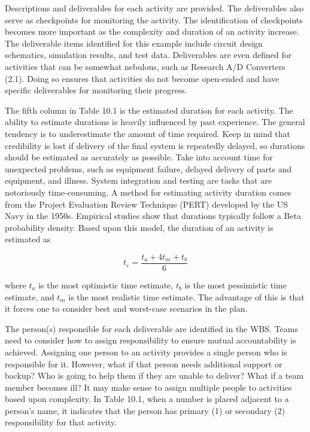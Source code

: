 Descriptions and deliverables for each activity are provided. The
deliverables also serve as checkpoints for monitoring the activity. The
identification of checkpoints becomes more important as the complexity
and duration of an activity increase. The deliverable items identified
for this example include circuit design schematics, simulation results,
and test data. Deliverables are even defined for activities that can be
somewhat nebulous, such as Research A/D Converters (2.1). Doing so
ensures that activities do not become open-ended and have specific
deliverables for monitoring their progress.

The fifth column in Table 10.1 is the estimated duration for each
activity. The ability to estimate durations is heavily influenced by
past experience. The general tendency is to underestimate the amount of
time required. Keep in mind that credibility is lost if delivery of the
final system is repeatedly delayed, so durations should be estimated as
accurately as possible. Take into account time for unexpected problems,
such as equipment failure, delayed delivery of parts and equipment, and
illness. System integration and testing are tasks that are notoriously
time-consuming. A method for estimating activity duration comes from the
Project Evaluation Review Technique (PERT) developed by the US Navy in
the 1950s. Empirical studies show that durations typically follow a Beta
probability density. Based upon this model, the duration of an activity
is estimated as

\begin{equation}
\label{equ:projectTimeEstimate}
t_e = \frac{t_a + 4t_m + t_b}{6}
\end{equation}

where $t_a$ is the most optimistic time
estimate, $t_b$ is the most pessimistic
time estimate, and $t_m$ is the most
realistic time estimate. The advantage of this is that it forces one to
consider best and worst-case scenarios in the plan.

The person(s) responsible for each deliverable are identified in the
WBS. Teams need to consider how to assign responsibility to ensure
mutual accountability is achieved. Assigning one person to an activity
provides a single person who is responsible for it. However, what if
that person needs additional support or backup? Who is going to help
them if they are unable to deliver? What if a team member becomes ill?
It may make sense to assign multiple people to activities based upon
complexity. In Table 10.1, when a number is placed adjacent to a
person's name, it indicates that the person has primary (1) or secondary
(2) responsibility for that activity.

